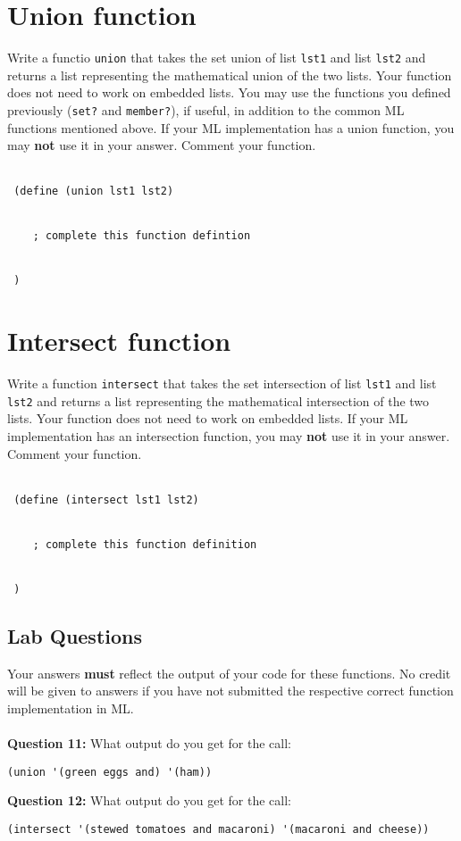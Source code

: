 \documentclass{article}
\begin{document}
\section*{Union function}
Write a functio \verb|union| that takes the set union of list \verb|lst1| and list \verb|lst2| and returns a list representing the mathematical union of the two lists. Your function does not need to work on embedded lists. You may use the functions you defined previously (\verb|set?| and \verb|member?|), if useful, in addition to the common ML functions mentioned above. If your ML implementation has a union function, you may \textbf{not} use it in your answer. Comment your function.
\\\\
\begin{lstlisting}
 (define (union lst1 lst2)
 
 
    ; complete this function defintion
    
    
 )
\end{lstlisting}


\section*{Intersect function}
Write a function \verb|intersect| that takes the set intersection of list \verb|lst1| and list \verb|lst2| and returns a list representing the mathematical intersection of the two lists. Your function does not need to work on embedded lists. If your ML implementation has an intersection function, you may \textbf{not} use it in your answer. Comment your function.
\\\\
\begin{lstlisting}
 (define (intersect lst1 lst2)
 
 
    ; complete this function definition
    
    
 )
\end{lstlisting}


\begin{tcolorbox}
 \section*{Lab Questions}
 Your answers \textbf{must} reflect the output of your code for these functions. No credit will be given to answers if you have not submitted the respective correct function implementation in ML.
 \\\\
 \textbf{Question 11:} What output do you get for the call:
 \begin{center}
  \verb|(union '(green eggs and) '(ham))|
 \end{center}
 \textbf{Question 12:} What output do you get for the call:
 \begin{center}
  \verb|(intersect '(stewed tomatoes and macaroni) '(macaroni and cheese))|
 \end{center}

\end{tcolorbox}
\end{document}
